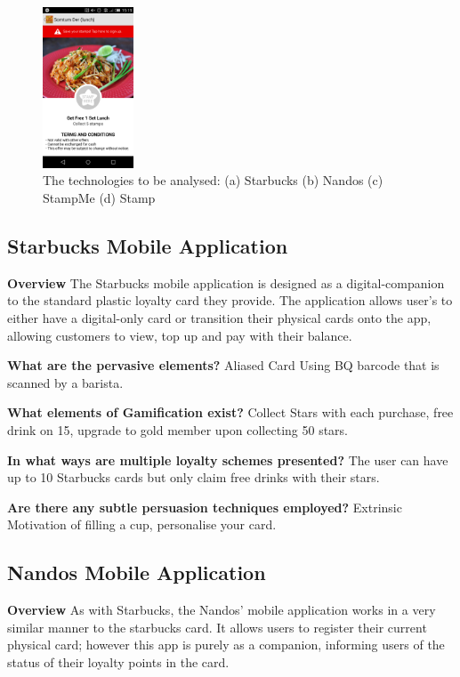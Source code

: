 \begin{figure}[H]
    \includegraphics[width=0.24\textwidth]{img/stamp.png}
      \caption{The technologies to be analysed: (a) Starbucks (b) Nandos (c) StampMe (d) Stamp}
\end{figure}

\subsection{Starbucks Mobile Application}
\textbf{Overview}
The Starbucks mobile application is designed as a digital-companion to the standard plastic loyalty card they provide. The application allows user's to either have a digital-only card or transition their physical cards onto the app, allowing customers to view, top up and pay with their balance.

\textbf{What are the pervasive elements?}
Aliased Card Using BQ barcode that is scanned by a barista.

\textbf{What elements of Gamification exist?}
Collect Stars with each purchase, free drink on 15, upgrade to gold member upon collecting 50 stars.


\textbf{In what ways are multiple loyalty schemes presented?}
The user can have up to 10 Starbucks cards but only claim free drinks with their stars.

\textbf{Are there any subtle persuasion techniques employed?}
Extrinsic Motivation of filling a cup, personalise your card.

\subsection{Nandos Mobile Application}
\textbf{Overview}
As with Starbucks, the Nandos' mobile application works in a very similar manner to the starbucks card. It allows users to register their current physical card; however this app is purely as a companion, informing users of the status of their loyalty points in the card.


